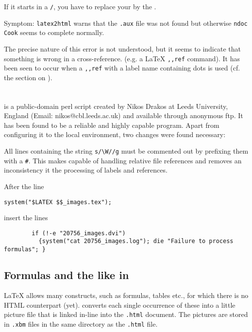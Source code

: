 If it starts in a \verb:/:, you have to replace your \ltoh by the 
. 

\item   Symptom: 
        \verb/latex2html/ warns that the \verb/.aux/ file was not found but
otherwise \verb/ndoc Cook/ seems to complete normally. 

        The precise nature of this error is not understood, but it seems to
indicate that something is wrong in a cross-reference. (e.g. a LaTeX 
\verb/,,ref/ command). It has been seen to occur when a \verb/,,ref/ with a
label name containing dots is used (cf. the section on ). 
\ei 


\appendix

\section{\protect\ltoh} 
\label{.latex2html} 

        \ltoh is a public-domain perl script created by Nikos Drakos at Leeds
University, England (Email: nikos@cbl.leeds.ac.uk) and available through
anonymous ftp. It has been found to be a reliable and highly capable program.
Apart from configuring it to the local environment, two changes were found
necessary: 

\bi 
\item   All lines containing the string \verb:s/\W//g: must be commented out by
prefixing them with a \verb/#/. This makes \ltoh capable of handling relative
file references and removes an inconsistency it the processing of labels and
references. 

\item   After the line 

\indent \verb/system("$LATEX $$_images.tex");/ 

insert the lines 

\begin{verbatim} 
        if (!-e "20756_images.dvi") 
          {system("cat 20756_images.log"); die "Failure to process formulas"; } 
\end{verbatim}
\ei 

\subsection{ Formulas and the like in \protect\ltoh}
\label{.formulas}

        LaTeX allows many constructs, such as formulas, tables etc., for which
there is no HTML counterpart (yet). \ltoh converts each single occurrence of
these into a little picture file that is linked in-line into the \verb/.html/
document. The pictures are stored in \verb/.xbm/ files in the same directory as
the \verb/.html/ file.

